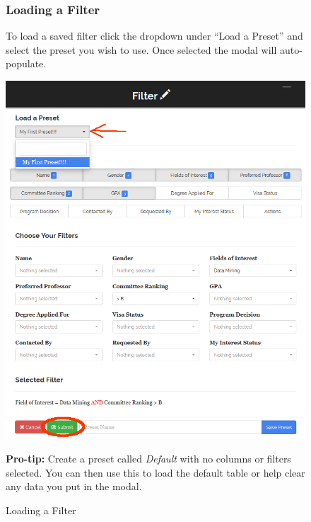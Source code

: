 \documentclass[fontsize=12pt,paper=letter,twoside]{scrartcl}
\begin{document}
\clearpage
\begin{figure}[!htb]
\subsubsection{Loading a Filter}
To load a saved filter click the dropdown under ``Load a Preset'' and select the preset you wish to use. Once selected the modal will auto-populate.
\begin{center}
\includegraphics[width=.99\textwidth]{images/load_filter.png}
\end{center}
\caption{Loading a Filter}
\textbf{Pro-tip:} Create a preset called \emph{Default} with no columns or filters selected. You can then use this to load the default table or help clear any data you put in the modal.
\label{fig:save_filter}
\end{figure}

\clearpage
\end{document}
